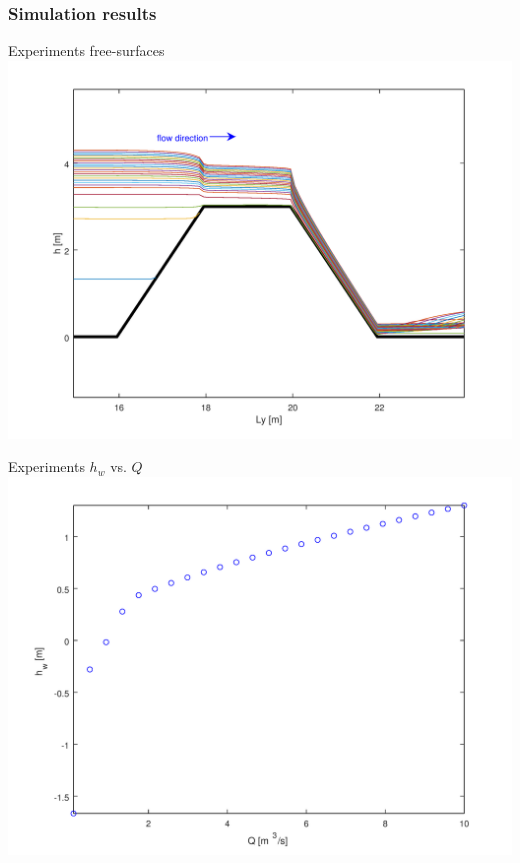 \documentclass[xcolor=dvipsnames, USenglish]{beamer}  %
\begin{document}
  \begin{frame}
    \frametitle{Simulation results}
    \begin{minipage}{.5\textwidth}
      \centering
      \small{Experiments free-surfaces}\\
      \includegraphics[width=\textwidth]{img/free_surfaces.png}
    \end{minipage}%
    \begin{minipage}{.5\textwidth}
      \centering
      \small{Experiments $h_w$ vs. $Q$}\\
      \includegraphics[width=\textwidth]{img/simulation_results.png}
    \end{minipage}
  \end{frame}
\end{document}
